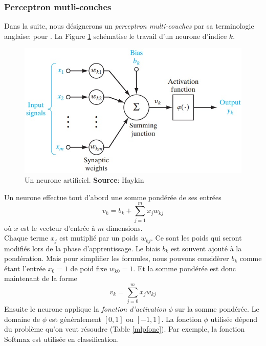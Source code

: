 \subsubsection{Perceptron mutli-couches}
Dans la suite, nous désignerons un \emph{perceptron multi-couches} par sa terminologie anglaise: \mlp pour .
La Figure \ref{neuronemlp} schématise le travail d'un neurone d'indice $k$.
\begin{figure}
 \centering
 \includegraphics[scale=0.5]{../figures/neurone.jpg}
 \caption{Un neurone artificiel. \textbf{Source}: Haykin\cite{Haykin}}
 \label{neuronemlp}
\end{figure}
Un neurone effectue tout d'abord une somme pondérée de ses entrées \[v_k = b_k+\sum_{j=1}^{m}x_{j}w_{kj}\] où $x$ est le vecteur d'entrée à $m$ dimensions.\\
Chaque terme $x_j$ est mutiplié par un poids $w_{kj}$.
Ce sont les poids qui seront modifiés lors de la phase d'apprentissage.
Le biais $b_k$ est souvent ajouté à la pondération.
Mais pour simplifier les formules, nous pouvons considèrer $b_k$ comme étant l'entrée $x_0 = 1$ de poid fixe $w_{k0} = 1$.
Et la somme pondérée est donc maintenant de la forme \[v_k = \sum_{j=0}^{m}x_{j}w_{kj}\]
Ensuite le neurone applique la \emph{fonction d'activation} $\phi$ sur la somme pondérée.
Le domaine de $\phi$ est généralement $[0,1]$ ou $[-1,1]$.\cite{Haykin,statistica}
La fonction $\phi$ utilisée dépend du problème qu'on veut résoudre (Table \ref{mlpfonc}).
Par exemple, la fonction Softmax est utilisée en classification.\cite{statistica}%

